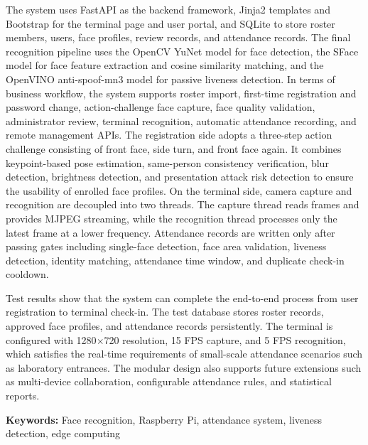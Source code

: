 \documentclass{heuthesis}
\begin{document}
The system uses FastAPI as the backend framework, Jinja2 templates and Bootstrap for the terminal page and user portal, and SQLite to store roster members, users, face profiles, review records, and attendance records. The final recognition pipeline uses the OpenCV YuNet model for face detection, the SFace model for face feature extraction and cosine similarity matching, and the OpenVINO anti-spoof-mn3 model for passive liveness detection. In terms of business workflow, the system supports roster import, first-time registration and password change, action-challenge face capture, face quality validation, administrator review, terminal recognition, automatic attendance recording, and remote management APIs. The registration side adopts a three-step action challenge consisting of front face, side turn, and front face again. It combines keypoint-based pose estimation, same-person consistency verification, blur detection, brightness detection, and presentation attack risk detection to ensure the usability of enrolled face profiles. On the terminal side, camera capture and recognition are decoupled into two threads. The capture thread reads frames and provides MJPEG streaming, while the recognition thread processes only the latest frame at a lower frequency. Attendance records are written only after passing gates including single-face detection, face area validation, liveness detection, identity matching, attendance time window, and duplicate check-in cooldown.

Test results show that the system can complete the end-to-end process from user registration to terminal check-in. The test database stores roster records, approved face profiles, and attendance records persistently. The terminal is configured with 1280$\times$720 resolution, 15 FPS capture, and 5 FPS recognition, which satisfies the real-time requirements of small-scale attendance scenarios such as laboratory entrances. The modular design also supports future extensions such as multi-device collaboration, configurable attendance rules, and statistical reports.

\medskip
\noindent\textbf{Keywords:} Face recognition, Raspberry Pi, attendance system, liveness detection, edge computing

\tableofcontents
\clearpage








\end{document}
